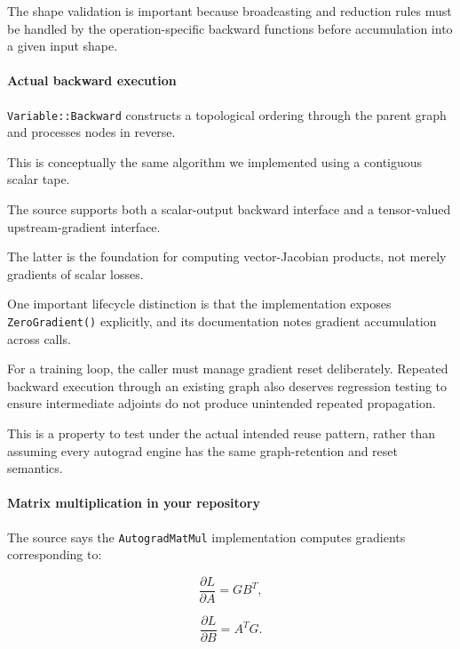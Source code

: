 The shape validation is important because broadcasting and reduction rules must be handled by the operation-specific backward functions before accumulation into a given input shape.

\paragraph{Actual backward execution}\label{02-foundations-ii-ch022-actual-backward-execution}

\hypertarget{02-foundations-ii-ch022-actual-backward-execution}{}

\texttt{Variable::Backward} constructs a topological ordering through the parent graph and processes nodes in reverse.

This is conceptually the same algorithm we implemented using a contiguous scalar tape.

The source supports both a scalar-output backward interface and a tensor-valued upstream-gradient interface.

The latter is the foundation for computing vector-Jacobian products, not merely gradients of scalar losses.

One important lifecycle distinction is that the implementation exposes \texttt{ZeroGradient()} explicitly, and its documentation notes gradient accumulation across calls.

For a training loop, the caller must manage gradient reset deliberately. Repeated backward execution through an existing graph also deserves regression testing to ensure intermediate adjoints do not produce unintended repeated propagation.

This is a property to test under the actual intended reuse pattern, rather than assuming every autograd engine has the same graph-retention and reset semantics.

\paragraph{Matrix multiplication in your repository}\label{02-foundations-ii-ch022-matrix-multiplication-in-your-repository}

\hypertarget{02-foundations-ii-ch022-matrix-multiplication-in-your-repository}{}

The source says the \texttt{AutogradMatMul} implementation computes gradients corresponding to:

\[
\frac{\partial L}{\partial A}=GB^T,
\]

\[
\frac{\partial L}{\partial B}=A^TG.
\]

